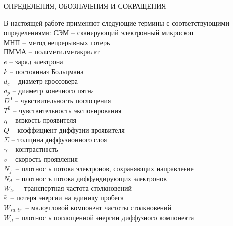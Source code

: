 \begin{center}
ОПРЕДЕЛЕНИЯ, ОБОЗНАЧЕНИЯ И СОКРАЩЕНИЯ
\end{center}

В настоящей работе применяют следующие термины с соответствующими определениями:
СЭМ -- сканирующий электронный микроскоп\\
МНП -- метод непрерывных потерь\\
ПММА -- полиметилметакрилат\\
$e$ -- заряд электрона\\
$k$ -- постоянная Больцмана\\
$d_c$ -- диаметр кроссовера\\
$d_p$ -- диаметр конечного пятна\\
$D^0$ -- чувствительность поглощения\\
$T^0$ -- чувствительность экспонирования\\
$\eta$ -- вязкость проявителя\\
$Q$ -- коэффициент диффузии проявителя\\
$\Sigma$ -- толщина диффузионного слоя\\
$\gamma$ -- контрастность\\
$v$ -- скорость проявления\\
$N_f$~-- плотность потока электронов, сохраняющих направление\\
$N_d$~-- плотность потока диффундирующих электронов\\
$W_{tr}$~-- транспортная частота столкновений\\
$\bar{\varepsilon}$~-- потеря энергии на единицу пробега\\
$W_{sa,tr}$~-- малоугловой компонент частоты столкновений\\
$W_d$ -- плотность поглощенной энергии диффузного компонента
